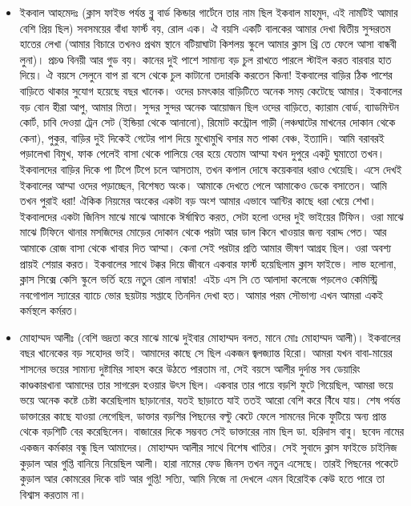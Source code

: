 \documentclass{report}
\begin{document}
\begin{itemize}
\item  ইকবাল আহমেদঃ (ক্লাস ফাইভ পর্যন্ত ব্লু বার্ড কিন্ডার গার্টেনে তার নাম ছিল ইকবাল মাহমুদ, এই নামটিই আমার বেশি প্রিয় ছিল) সবসময়ের বাঁধা ফার্স্ট বয়, রোল এক। ঐ বয়সি একটি বালকের আমার দেখা দ্বিতীয় সুন্দরতম হাতের লেখা (আমার বিচারে তখনও প্রথম স্থানে বটিয়াঘাটা কিশলয় স্কুলে আমার ক্লাস থ্রি তে ফেলে আসা বান্ধবী লুনা)। প্রচণ্ড বিনয়ী আর গুড বয়। কানের দুই পাশে সামান্য বড় চুল রাখতে পারলে স্টাইল করত বারবার হাত দিয়ে। ঐ বয়সে সেলুনে বাপ রা বসে থেকে চুল কাটানো তদারকি করতেন কিনা! ইকবালের বাড়ির ঠিক পাশের বাড়িতে থাকার সুযোগ হয়েছে বছর খানেক। ওদের চমৎকার বাড়িটিতে অনেক সময় কেটেছে আমার। ইকবালের বড় বোন হীরা আপু, আমার মিতা। সুন্দর সুন্দর অনেক আয়োজন ছিল ওদের বাড়িতে, ক্যারাম বোর্ড, ব্যাডমিন্টন কোর্ট, চাবি দেওয়া ট্রেন সেট (ইন্ডিয়া থেকে আনানো), রিমোট কন্ট্রোল গাড়ী (লঞ্চঘাটের মাখনের দোকান থেকে কেনা), পুকুর, বাড়ির দুই দিকেই গেটের পাশ দিয়ে মুখোমুখি বসার মত পাকা বেঞ্চ, ইত্যাদি। আমি বরাবরই পড়ালেখা বিমুখ, ফাক পেলেই বাসা থেকে পালিয়ে বের হয়ে যেতাম আম্মা যখন দুপুরে একটু ঘুমাতো তখন। ইকবালদের বাড়ির দিকে পা টিপে টিপে চলে আসতাম, তখন কপাল দোষে কয়েকবার ধরাও খেয়েছি। এসে দেখই ইকবালের আম্মা ওদের পড়াচ্ছেন, বিশেষত অংক। আমাকে দেখতে পেলে আমাকেও ডেকে বসাতেন। আমি তখন পুরাই ধরা! ঐকিক নিয়মের অংকের একটা বড় অংশ আমার এভাবে আন্টির কাছে ধরা খেয়ে শেখা।  ইকবালদের একটা জিনিস মাঝে মাঝে আমাকে ঈর্ষান্বিত করত, সেটা হলো ওদের দুই ভাইয়ের টিফিন। ওরা মাঝে মাঝে টিফিনে থানার মসজিদের মোড়ের দোকান থেকে পরটা আর ডাল কিনে খাওয়ার জন্য বরাদ্দ পেত। আর আমাকে রোজ বাসা থেকে খাবার দিত আম্মা। কেনা সেই পরটার প্রতি আমার ভীষণ আগ্রহ ছিল। ওরা অবশ্য প্রায়ই শেয়ার করত। ইকবালের সাথে টক্কর দিয়ে জীবনে একবার ফার্স্ট হয়েছিলাম ক্লাস ফাইভে। লাভ হলোনা, ক্লাস সিক্সে কেসি স্কুলে ভর্তি হয়ে নতুন রোল নাম্বার! এইচ এস সি তে আলাদা কলেজে পড়লেও কেমিস্ট্রি নবগোপাল স্যারের ব্যাচে ভোর ছয়টায় সপ্তাহে তিনদিন দেখা হত। আমার পরম সৌভাগ্য এখন আমরা একই কর্মস্থলে কর্মরত।
\item  মোহাম্মদ আলীঃ (বেশি ভদ্রতা করে মাঝে মাঝে দুইবার মোহাম্মদ বলত, মানে মোঃ মোহাম্মদ আলী)। ইকবালের বছর খানেকের বড় সহোদর ভাই। আমাদের কাছে সে ছিল একজন জ্বলজ্যান্ত হিরো। আমরা যখন বাবা-মায়ের শাসনের ভয়ের সামান্য দুষ্টামির সাহস করে উঠতে পারতাম না, সেই বয়সে আলীর দুর্দান্ত সব ডেয়ারিং কাণ্ডকারখানা আমাদের তার সাগরেদ হওয়ার উৎস ছিল। একবার তার পায়ে বড়শি ফুটে গিয়েছিল, আমরা ভয়ে ভয়ে অনেক কষ্টে চেষ্টা করেছিলাম ছাড়ানোর, যতই ছাড়াতে যাই ততই আরো বেশি করে বিঁধে যায়। শেষ পর্যন্ত ডাক্তারের কাছে যাওয়া লেগেছিল, ডাক্তার বড়শির পিছনের বল্টু কেটে ফেলে সামনের দিকে ফুটিয়ে অন্য প্রান্ত থেকে বড়শিটি বের করেছিলেন। বাজারের দিকে সম্ভবত সেই ডাক্তারের নাম ছিল ডা. হরিদাস বাবু। ছবেদ নামের একজন কর্মকার বন্ধু ছিল আমাদের। মোহাম্মদ আলীর সাথে বিশেষ খাতির। সেই সুবাদে ক্লাস ফাইভে চাইনিজ কুড়াল আর গুপ্তি বানিয়ে নিয়েছিল আলী। হারা নামের ফেড জিনস তখন নতুন এসেছে। তারই পিছনের পকেটে কুড়াল আর কোমরের দিকে বাট আর গুপ্তি! সত্যি, আমি নিজে না দেখলে এমন হিরোইক কেউ হতে পারে তা বিশ্বাস করতাম না।

\end{itemize}
\end{document}
